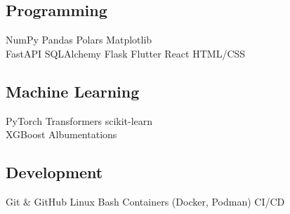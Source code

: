 \documentclass[]{resume-template}
\begin{document}
\begin{minipage}[t]{0.33\textwidth}
    \subsection{Programming}\label{subsec:programming}
    NumPy\textbullet{} Pandas\textbullet{} Polars\textbullet{} Matplotlib\\
    FastAPI \textbullet{} SQLAlchemy \textbullet{} Flask
    \newline{}
    Flutter \textbullet{} React \textbullet{} HTML/CSS \textbullet{}


    \vspace*{1pt}\subsection{Machine Learning}\label{subsec:mltools}
    PyTorch \textbullet{} Transformers \textbullet{} scikit-learn \\
    XGBoost \textbullet{} Albumentations

    \vspace*{1pt}\subsection{Development}
    Git \& GitHub \textbullet{} Linux \textbullet{} Bash \textbullet{} Containers (Docker, Podman) \textbullet{} CI/CD \textbullet{}



\end{minipage}
\end{document}
